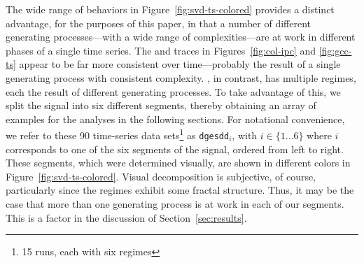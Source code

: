 The wide range of behaviors in Figure~\ref{fig:svd-ts-colored}
provides a distinct advantage, for the purposes of this paper, in that
a number of different generating processes---with a wide range of
complexities---are at work in different phases of a single time
series.  The \col and \gcc traces in Figures~\ref{fig:col-ipc} and
\ref{fig:gcc-ts} appear to be far more consistent over time---probably
the result of a single generating process with consistent complexity.
\svd, in contrast, has multiple regimes, each the result of different
generating processes.  To take advantage of this, we split the signal
into six different segments, thereby obtaining an array of examples
for the analyses in the following sections.  For notational
convenience, we refer to these 90 time-series data sets\footnote{15
  runs, each with six regimes} as {\tt dgesdd$_i$}, with $i \in
\{1\dots6\}$ where $i$ corresponds to one of the six segments of the
signal, ordered from left to right.  These segments, which were
determined visually, are shown in different colors in
Figure~\ref{fig:svd-ts-colored}.  Visual decomposition is subjective,
of course, particularly since the regimes exhibit some fractal
structure.  Thus, it may be the case that more than one generating
process is at work in each of our segments.  This is a factor in the
discussion of Section~\ref{sec:results}.

